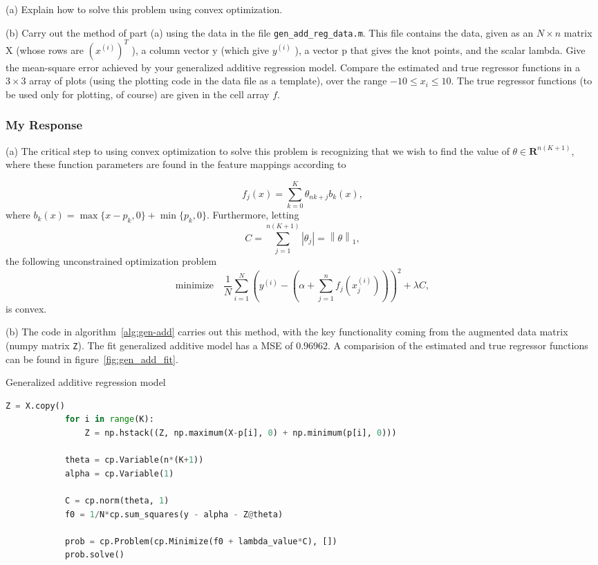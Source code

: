 \documentclass[12pt,reqno]{article}
\theoremstyle{definition}
\numberwithin{equation}{section}
\begin{document}
\vspace{0.1cm}
\noindent (a) Explain how to solve this problem using convex optimization.

\vspace{0.1cm}
\noindent (b) Carry out the method of part (a) using the data in the file \lstinline|gen_add_reg_data.m|. This file contains the data, given as an $N \times n$ matrix $\mathrm{X}$
(whose rows are $\left(x^{(i)}\right)^T$ ), a column vector $\mathrm{y}$ (which give $y^{(i)}$ ), a vector $\mathrm{p}$ that gives the knot points, and the scalar lambda.
Give the mean-square error achieved by your generalized additive regression model.
Compare the estimated and true regressor functions in a $3 \times 3$ array of plots (using the plotting code in the data file as a template), over the range $-10 \leq x_i \leq 10$. The true regressor functions (to be used only for plotting, of course) are given in the cell array $f$.

\subsubsection*{My Response}

\noindent (a) The critical step to using convex optimization to solve this problem is recognizing that
we wish to find the value of $\theta \in \mathbf{R}^{n(K+1)}$, where these function parameters 
are found in the feature mappings according to

\[f_{j}(x) = \sum_{k=0}^{K}\theta_{nk + j} b_k(x),\]
where $b_k(x) = \max\{x-p_k, 0\} + \min\{p_k, 0\}$.
Furthermore, letting
\[C = \sum_{j=1}^{n(K+1)} \left| \theta_j \right| = \left\lVert \theta \right\rVert_{1},\]
the following unconstrained optimization problem
\[\mathrm{minimize} \quad \frac{1}{N} \sum_{i=1}^{N}\left(y^{(i)} - (\alpha + \sum_{j=1}^{n}f_j(x_j^{(i)}) ) \right)^2 + \lambda C,\]
is convex.

\noindent (b) The code in algorithm~\ref{alg:gen-add} carries out this method, with the key
functionality coming from the augmented data matrix (numpy matrix \lstinline|Z|). The fit generalized additive
model has a MSE of $0.96962$. A comparision of the estimated and true regressor functions can be found in
figure~\ref{fig:gen_add_fit}.

\begin{algorithm}[htbp]
    \caption{Generalized additive regression model}
    \centering
        \begin{lstlisting}[language=Python]
            Z = X.copy()
            for i in range(K):
                Z = np.hstack((Z, np.maximum(X-p[i], 0) + np.minimum(p[i], 0)))

            theta = cp.Variable(n*(K+1))
            alpha = cp.Variable(1)

            C = cp.norm(theta, 1)
            f0 = 1/N*cp.sum_squares(y - alpha - Z@theta)

            prob = cp.Problem(cp.Minimize(f0 + lambda_value*C), [])
            prob.solve()
        \end{lstlisting}
    \label{alg:gen-add}
\end{algorithm}
\end{document}
